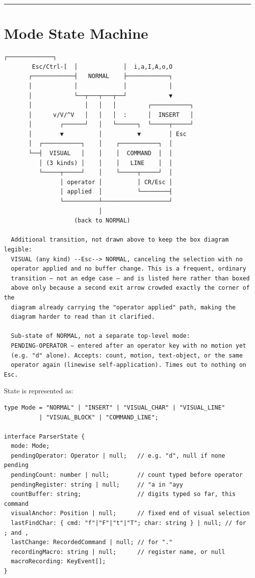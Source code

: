\documentclass[11pt]{article}
\begin{document}
\begin{center}\rule{0.5\linewidth}{0.5pt}\end{center}

\hypertarget{sec-mode-state-machine}{%
\section{Mode State Machine}\label{sec-mode-state-machine}}

\begin{Verbatim}[breaklines=true, breakanywhere=true, fontsize=\small]
                    ┌─────────────┐
        Esc/Ctrl-[  │             │  i,a,I,A,o,O
       ┌────────────┤   NORMAL    ├────────────┐
       │            │             │            │
       │            └──┬───┬───┬──┘            ▼
       │               │   │   │         ┌───────────┐
       │      v/V/^V   │   │   │  :      │  INSERT   │
       │        ┌──────┘   │   └──────┐  └─────┬─────┘
       │        ▼          │          ▼        │ Esc
       │  ┌───────────┐    │    ┌───────────┐  │
       └──┤  VISUAL   │    │    │  COMMAND  │  │
          │ (3 kinds) │    │    │   LINE    │  │
          └─────┬─────┘    │    └─────┬─────┘  │
                │ operator │          │ CR/Esc │
                │ applied  │          └────────┤
                └──────────┴───────────────────┘
                           │
                    (back to NORMAL)

  Additional transition, not drawn above to keep the box diagram legible:
  VISUAL (any kind) --Esc--> NORMAL, canceling the selection with no
  operator applied and no buffer change. This is a frequent, ordinary
  transition — not an edge case — and is listed here rather than boxed
  above only because a second exit arrow crowded exactly the corner of the
  diagram already carrying the "operator applied" path, making the
  diagram harder to read than it clarified.

  Sub-state of NORMAL, not a separate top-level mode:
  PENDING-OPERATOR — entered after an operator key with no motion yet
  (e.g. "d" alone). Accepts: count, motion, text-object, or the same
  operator again (linewise self-application). Times out to nothing on Esc.
\end{Verbatim}

State is represented as:

\begin{Verbatim}[breaklines=true, breakanywhere=true, fontsize=\small]
type Mode = "NORMAL" | "INSERT" | "VISUAL_CHAR" | "VISUAL_LINE"
          | "VISUAL_BLOCK" | "COMMAND_LINE";

interface ParserState {
  mode: Mode;
  pendingOperator: Operator | null;   // e.g. "d", null if none pending
  pendingCount: number | null;        // count typed before operator
  pendingRegister: string | null;     // "a in "ayy
  countBuffer: string;                // digits typed so far, this command
  visualAnchor: Position | null;      // fixed end of visual selection
  lastFindChar: { cmd: "f"|"F"|"t"|"T"; char: string } | null; // for ; and ,
  lastChange: RecordedCommand | null; // for "."
  recordingMacro: string | null;      // register name, or null
  macroRecording: KeyEvent[];
}
\end{Verbatim}
\end{document}

